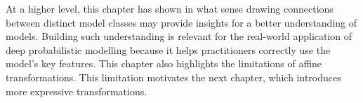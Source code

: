At a higher level, this chapter has shown in what sense drawing connections between distinct model classes may provide insights for a better understanding of models. Building such understanding is relevant for the real-world application of deep probabilistic modelling because it helps practitioners correctly use the model's key features. This chapter also highlights the limitations of affine transformations. This limitation motivates the next chapter, which introduces more expressive transformations.
%
